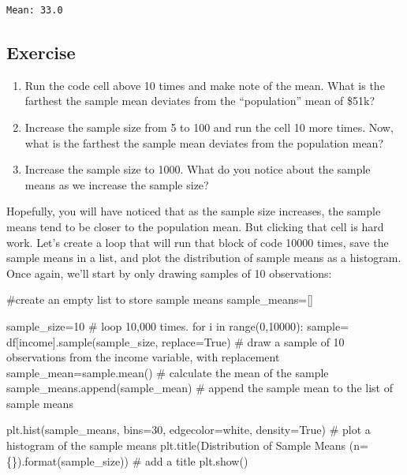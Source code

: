 \documentclass[
  letterpaper,
  DIV=11,
  numbers=noendperiod]{scrreprt}
\newenvironment{Shaded}{\begin{snugshade}}{\end{snugshade}}
\newcommand{\BuiltInTok}[1]{\textcolor[rgb]{0.00,0.23,0.31}{#1}}
\newcommand{\CommentTok}[1]{\textcolor[rgb]{0.37,0.37,0.37}{#1}}
\newcommand{\ControlFlowTok}[1]{\textcolor[rgb]{0.00,0.23,0.31}{#1}}
\newcommand{\DecValTok}[1]{\textcolor[rgb]{0.68,0.00,0.00}{#1}}
\newcommand{\KeywordTok}[1]{\textcolor[rgb]{0.00,0.23,0.31}{#1}}
\newcommand{\NormalTok}[1]{\textcolor[rgb]{0.00,0.23,0.31}{#1}}
\newcommand{\OperatorTok}[1]{\textcolor[rgb]{0.37,0.37,0.37}{#1}}
\newcommand{\SpecialCharTok}[1]{\textcolor[rgb]{0.37,0.37,0.37}{#1}}
\newcommand{\StringTok}[1]{\textcolor[rgb]{0.13,0.47,0.30}{#1}}
\newcommand{\VariableTok}[1]{\textcolor[rgb]{0.07,0.07,0.07}{#1}}
\providecommand{\tightlist}{%
  \setlength{\itemsep}{0pt}\setlength{\parskip}{0pt}}\usepackage{longtable,booktabs,array}
\begin{document}
\begin{verbatim}
Mean: 33.0
\end{verbatim}

\hypertarget{exercise-14}{%
\subsection{Exercise}\label{exercise-14}}

\begin{enumerate}
\def\labelenumi{\arabic{enumi}.}
\tightlist
\item
  Run the code cell above 10 times and make note of the mean. What is
  the farthest the sample mean deviates from the ``population'' mean of
  \$51k?
\item
  Increase the sample size from 5 to 100 and run the cell 10 more times.
  Now, what is the farthest the sample mean deviates from the population
  mean?
\item
  Increase the sample size to 1000. What do you notice about the sample
  means as we increase the sample size?
\end{enumerate}

Hopefully, you will have noticed that as the sample size increases, the
sample means tend to be closer to the population mean. But clicking that
cell is hard work. Let's create a loop that will run that block of code
10000 times, save the sample means in a list, and plot the distribution
of sample means as a histogram. Once again, we'll start by only drawing
samples of 10 observations:

\begin{Shaded}
\begin{Highlighting}[]
\CommentTok{\#create an empty list to store sample means}
\NormalTok{sample\_means}\OperatorTok{=}\NormalTok{[]}

\NormalTok{sample\_size}\OperatorTok{=}\DecValTok{10}
\CommentTok{\# loop 10,000 times.}
\ControlFlowTok{for}\NormalTok{ i }\KeywordTok{in} \BuiltInTok{range}\NormalTok{(}\DecValTok{0}\NormalTok{,}\DecValTok{10000}\NormalTok{):}
\NormalTok{    sample}\OperatorTok{=}\NormalTok{ df[}\StringTok{\textquotesingle{}income\textquotesingle{}}\NormalTok{].sample(sample\_size, replace}\OperatorTok{=}\VariableTok{True}\NormalTok{) }\CommentTok{\# draw a sample of 10 observations from the income variable, with replacement}
\NormalTok{    sample\_mean}\OperatorTok{=}\NormalTok{sample.mean() }\CommentTok{\# calculate the mean of the sample}
\NormalTok{    sample\_means.append(sample\_mean) }\CommentTok{\# append the sample mean to the list of sample means}
    
\NormalTok{plt.hist(sample\_means, bins}\OperatorTok{=}\DecValTok{30}\NormalTok{, edgecolor}\OperatorTok{=}\StringTok{\textquotesingle{}white\textquotesingle{}}\NormalTok{, density}\OperatorTok{=}\VariableTok{True}\NormalTok{) }\CommentTok{\# plot a histogram of the sample means}
\NormalTok{plt.title(}\StringTok{\textquotesingle{}Distribution of Sample Means (n=}\SpecialCharTok{\{\}}\StringTok{)\textquotesingle{}}\NormalTok{.}\BuiltInTok{format}\NormalTok{(sample\_size)) }\CommentTok{\# add a title}
\NormalTok{plt.show()}
\end{Highlighting}
\end{Shaded}
\end{document}

